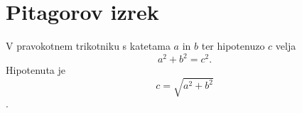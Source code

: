 \documentclass{article}
\begin{document}
\section*{Pitagorov izrek}
V pravokotnem trikotniku s katetama \(a\) in \(b\) ter hipotenuzo \(c\) velja
\[ a^2 + b^2 = c^2. \]
Hipotenuta je $$c = \sqrt{a^2 + b^2} $$. 
\end{document}
